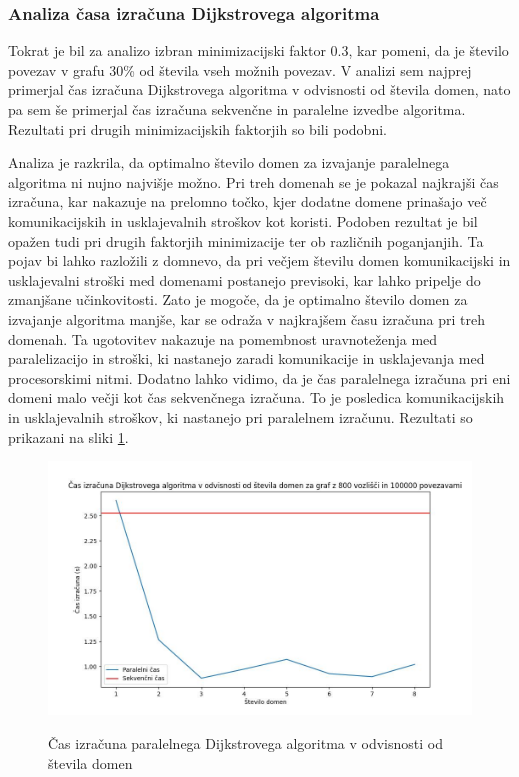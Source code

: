 \documentclass[mat1, tisk]{fmfdelo}
\begin{document}
\subsubsection{Analiza časa izračuna Dijkstrovega algoritma}

Tokrat je bil za analizo izbran minimizacijski faktor 0.3, kar pomeni, da je število povezav v grafu 30\% od števila vseh
možnih povezav. V analizi sem najprej primerjal čas izračuna Dijkstrovega algoritma v odvisnosti od števila domen,
nato pa sem še primerjal čas izračuna sekvenčne in paralelne izvedbe algoritma. Rezultati pri drugih minimizacijskih
faktorjih so bili podobni.

Analiza je razkrila, da optimalno število domen za izvajanje paralelnega algoritma ni nujno najvišje možno.
Pri treh domenah se je pokazal najkrajši čas izračuna, kar nakazuje na prelomno točko, kjer dodatne domene prinašajo
več komunikacijskih in usklajevalnih stroškov kot koristi.
Podoben rezultat je bil opažen tudi pri drugih faktorjih minimizacije ter ob različnih poganjanjih.
Ta pojav bi lahko razložili z domnevo, da pri večjem številu domen komunikacijski in usklajevalni stroški med domenami
postanejo previsoki, kar lahko pripelje do zmanjšane učinkovitosti. Zato je mogoče, da je optimalno število domen za
izvajanje algoritma manjše, kar se odraža v najkrajšem času izračuna pri treh domenah. Ta ugotovitev nakazuje na pomembnost
uravnoteženja med paralelizacijo in stroški, ki nastanejo zaradi komunikacije in usklajevanja med procesorskimi nitmi.
Dodatno lahko vidimo, da je čas paralelnega izračuna pri eni domeni malo večji kot čas sekvenčnega izračuna. To je posledica
komunikacijskih in usklajevalnih stroškov, ki nastanejo pri paralelnem izračunu.
Rezultati so prikazani na sliki \ref{fig:dijkstra_calculation_time_by_num_domains}.

\begin{figure}[h!]
  \centering
  \caption{Čas izračuna paralelnega Dijkstrovega algoritma v odvisnosti od števila domen}
  \includegraphics[width=15cm]{slike/dijkstra_v_odvisnosti_od_stevila_domen.jpg}
  \label{fig:dijkstra_calculation_time_by_num_domains}
\end{figure}
\end{document}
